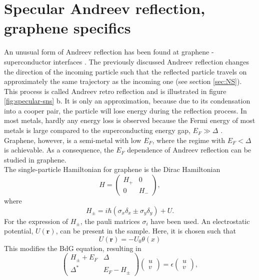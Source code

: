 \section{Specular Andreev reflection, graphene specifics}
An unusual form of Andreev reflection has been found at graphene - superconductor interfaces \cite{Beenakker2006}. The previously discussed Andreev reflection changes the direction of the incoming particle such that the reflected particle travels on approximately the same trajectory as the incoming one (see section \ref{sec:NS}). This process is called Andreev retro reflection and is illustrated in figure \ref{fig:specular-sns} b. It is only an approximation, because due to its condensation into a cooper pair, the particle will lose energy during the reflection process. In most metals, hardly any energy loss is observed because the Fermi energy of most metals is large compared to the superconducting energy gap, $E_F \gg \Delta$ \cite{Efetov2016}. Graphene, however, is a semi-metal with low $E_F$, where the regime with $E_F < \Delta$ is achievable. As a consequence, the $E_F$ dependence of Andreev reflection can be studied in graphene. \\
The single-particle Hamiltonian for graphene is the Dirac Hamiltonian
\begin{equation}
H = \begin{pmatrix}
H_+ & 0 \\
0 & H_- 
\end{pmatrix},
\end{equation}
where
\begin{equation}
H_\pm = i \hbar \left( \sigma_x \delta_x \pm \sigma_y \delta_y \right) + U.
\end{equation}
For the expression of $H_\pm$, the pauli matrices $\sigma_i$ have been used. An electrostatic potential, $U(\mathbf{r})$, can be present in the sample. Here, it is chosen such that
\begin{equation}
U(\mathbf{r}) = -U_0 \theta (x)
\end{equation} 
This modifies the BdG equation, resulting in 
\begin{equation}
\begin{pmatrix}
H_\pm + E_F & \Delta \\
\Delta^* & E_F - H_\pm 
\end{pmatrix} \begin{pmatrix}
u \\ v \end{pmatrix} = \epsilon \begin{pmatrix} u \\v \end{pmatrix}, \label{eq:dirac-hamiltonian}
\end{equation}
